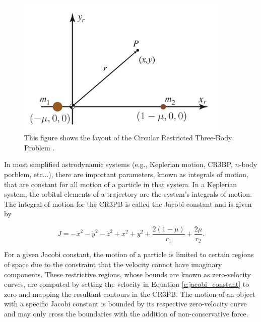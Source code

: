 \documentclass[11pt]{article} %
\begin{document}
\begin{figure}[H]
	\centering
	\includegraphics[width=4in]{CR3BP.png}\nonumber
	\caption{This figure shows the layout of the Circular Restricted Three-Body Problem \cite{KoonLoMarsdenRoss2011}.}
	\label{f:CR3BP}
\end{figure}

In most simplified astrodynamic systems (e.g., Keplerian motion, CR3BP, $n$-body porblem, etc...), there are important parameters, known as integrals of motion, that are constant for all motion of a particle in that system. In a Keplerian system, the orbital elements of a trajectory are the system's integrals of motion. The integral of motion for the CR3PB is called the Jacobi constant and is given by 

\begin{equation}
	J = -\dot{x}^2-\dot{y}^2-\dot{z}^2+x^2+y^2 + \frac{2\left(1-\mu\right)}{r_1} + \frac{2\mu}{r_2}.
	\label{e:jacobi_constant}
\end{equation}

\noindent
For a given Jacobi constant, the motion of a particle is limited to certain regions of space due to the constraint that the velocity cannot have imaginary components. These restrictive regions, whose bounds are known as zero-velocity curves, are computed by setting the velocity in Equation \ref{e:jacobi_constant} to zero and mapping the resultant contours in the CR3PB. The motion of an object with a specific Jacobi constant is bounded by its respective zero-velocity curve and may only cross the boundaries with the addition of non-conservative force.

\end{document}
